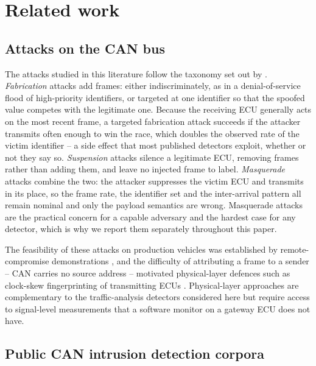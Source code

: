 \documentclass[preprint,11pt,authoryear]{elsarticle}
\begin{document}
\section{Related work}
\label{sec:related}

\subsection{Attacks on the CAN bus}

The attacks studied in this literature follow the taxonomy set out by \citet{verma2024road}.
\emph{Fabrication} attacks add frames: either indiscriminately, as in a denial-of-service flood of
high-priority identifiers, or targeted at one identifier so that the spoofed value competes with the
legitimate one. Because the receiving ECU generally acts on the most recent frame, a targeted
fabrication attack succeeds if the attacker transmits often enough to win the race, which
doubles the observed rate of the victim identifier -- a side effect that most published detectors
exploit, whether or not they say so. \emph{Suspension} attacks silence a legitimate ECU, removing
frames rather than adding them, and leave no injected frame to label. \emph{Masquerade} attacks
combine the two: the attacker suppresses the victim ECU and transmits in its place, so the frame
rate, the identifier set and the inter-arrival pattern all remain nominal and only the payload
semantics are wrong. Masquerade attacks are the practical concern for a capable adversary and the
hardest case for any detector, which is why we report them separately throughout this paper.

The feasibility of these attacks on production vehicles was established by remote-compromise
demonstrations \citep{miller2015remote}, and the difficulty of attributing a frame to a sender --
CAN carries no source address -- motivated physical-layer defences such as clock-skew fingerprinting
of transmitting ECUs \citep{cho2016fingerprinting}. Physical-layer approaches are complementary to
the traffic-analysis detectors considered here but require access to signal-level measurements that
a software monitor on a gateway ECU does not have.

\subsection{Public CAN intrusion detection corpora}
\end{document}

